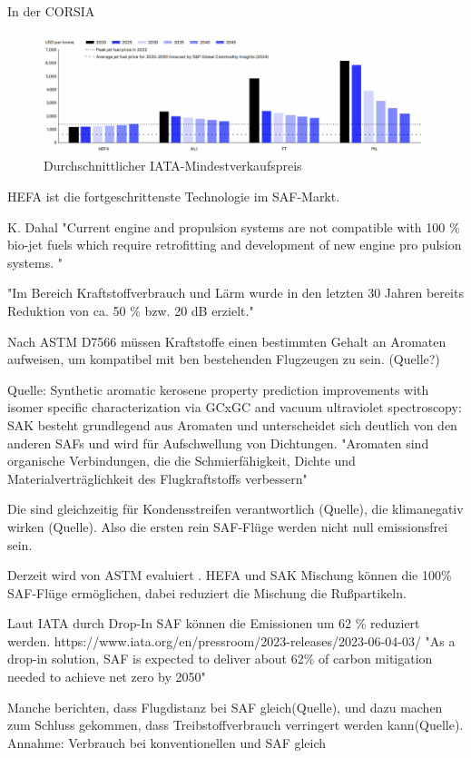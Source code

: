 In der CORSIA 


\begin{figure}[h]
	\centering
	\includegraphics[width=0.4\linewidth]{Bilder/Preise SAF.png}
	\caption[Durchschnittlicher IATA-Mindestverkaufspreis (MSP) der wichtigsten SAF-Pfade über den Zeitraum 2020 bis 2050]{Durchschnittlicher IATA-Mindestverkaufspreis \cite{icao_saf_conversion_2024}}
	\label{fuelcell}
\end{figure}

HEFA ist die fortgeschrittenste Technologie im SAF-Markt.

K. Dahal "Current 
engine and propulsion systems are not compatible with 100 \% bio-jet 
fuels which require retrofitting and development of new engine pro
pulsion systems. "

\cite{mensen2013handbuch}  "Im Bereich Kraftstoffverbrauch und Lärm wurde in den letzten 30 Jahren bereits 
Reduktion von ca. 50 \% bzw. 20 dB erzielt."


Nach ASTM D7566 müssen Kraftstoffe einen bestimmten Gehalt an Aromaten aufweisen, um kompatibel mit ben bestehenden Flugzeugen zu sein. (Quelle?)

Quelle: Synthetic aromatic kerosene property prediction improvements with isomer specific characterization via GCxGC 
and vacuum ultraviolet spectroscopy: 
SAK besteht grundlegend aus Aromaten und unterscheidet sich deutlich von den anderen SAFs und wird für Aufschwellung von Dichtungen. 
"Aromaten sind organische Verbindungen, die die Schmierfähigkeit, Dichte und Materialverträglichkeit des Flugkraftstoffs verbessern"

Die sind gleichzeitig für Kondensstreifen verantwortlich (Quelle), die klimanegativ wirken (Quelle). 
Also die ersten rein SAF-Flüge werden nicht null emissionsfrei sein.

Derzeit wird von ASTM evaluiert \cite{icao_saf_conversion_2024}.
HEFA und SAK Mischung können die 100\% SAF-Flüge ermöglichen, dabei reduziert die Mischung die Rußpartikeln.

Laut IATA durch Drop-In SAF können die Emissionen um 62 \% reduziert werden. https://www.iata.org/en/pressroom/2023-releases/2023-06-04-03/
"As a drop-in solution, SAF is expected to deliver about 62\% of carbon mitigation needed to achieve net zero by 2050"

Manche berichten, dass Flugdistanz bei SAF gleich(Quelle), und dazu machen zum Schluss gekommen, dass 
Treibstoffverbrauch verringert werden kann(Quelle).
Annahme: Verbrauch bei konventionellen und SAF gleich

